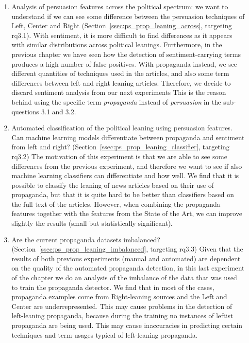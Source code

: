 \begin{enumerate}
    \item Analysis of persuasion features across the political spectrum: we want to understand if we can see some difference between the persuasion techniques of Left, Center and Right (Section~\ref{ssec:ps_prop_leaning_across}, targeting \acrshort{rq}3.1).
          With sentiment, it is more difficult to find differences as it appears with similar distributions across political leanings.
          Furthermore, in the previous chapter we have seen how the detection of sentiment-carrying terms produces a high number of false positives.
          With propaganda instead, we see different quantities of techniques used in the articles, and also some term differences between left and right leaning articles.
          Therefore, we decide to discard sentiment analysis from our next experiments
          This is the reason behind using the specific term \emph{propaganda} instead of \emph{persuasion} in the sub-questions 3.1 and 3.2.
    \item Automated classification of the political leaning using persuasion features. Can machine learning models differentiate between propaganda and sentiment from left and right? (Section~\ref{ssec:ps_prop_leaning_classifier}, targeting \acrshort{rq}3.2) The motivation of this experiment is that we are able to see some differences from the previous experiment, and therefore we want to see if also machine learning classifiers can differentiate and how well. We find that it is possible to classify the leaning of news articles based on their use of propaganda, but that it is quite hard to be better than classifiers based on the full text of the articles.
          However, when combining the propaganda features together with the features from the State of the Art, we can improve slightly the results (small but statistically significant).
    \item Are the current propaganda datasets imbalanced? (Section~\ref{ssec:ps_prop_leaning_imbalanced}, targeting \acrshort{rq}3.3) Given that the results of both previous experiments (manual and automated) are dependent on the quality of the automated propaganda detection, in this last experiment of the chapter we do an analysis of the imbalance of the data that was used to train the propaganda detector.
          We find that in most of the cases, propaganda examples come from Right-leaning sources and the Left and Center are underrepresented.
          This may cause problems in the detection of left-leaning propaganda, because during the training no instances of leftist propaganda are being used.
          This may cause inaccuracies in predicting certain techniques and term usages typical of left-leaning propaganda.
\end{enumerate}






